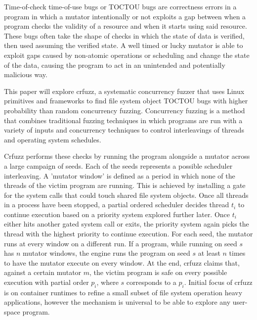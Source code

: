 

    Time-of-check time-of-use bugs or TOCTOU bugs are correctness errors in a program 
in which a mutator intentionally or not exploits a gap between when a program checks the validity of a resource and when it starts using 
said resource. These bugs often take the shape of checks in which the state of data is verified, then used assuming 
the verified state. A well timed or lucky mutator is able to exploit gaps caused by non-atomic operations or scheduling and change the state of the data,
causing the program to act in an unintended and potentially malicious way. 

This paper will explore crfuzz, a systematic concurrency fuzzer that uses Linux primitives and frameworks to find file system object TOCTOU bugs with higher probability than random concurrency fuzzing. Concurrency fuzzing is a method that combines traditional fuzzing techniques in which programs are 
run with a variety of inputs and concurrency techniques to control interleavings of threads and operating system schedules.

Crfuzz performs these checks by running the program alongside a mutator across a large campaign of seeds. Each of the seeds represents a possible scheduler interleaving.
A 'mutator window' is defined as a period in which none of the threads of the victim program are running. This is achieved by installing a gate for the system calls that could touch 
shared file system objects. Once all threads in a process have been stopped, a partial ordered scheduler decides thread  $t_i$ to continue execution based on a priority system 
explored further later. Once $t_i$ either hits another gated system call or exits, the priority system again picks the thread with the highest priority to continue execution.
For each seed, the mutator runs at every window on a different run. If a program, while running on seed $s$ has $n$ mutator windows, the engine runs the program on seed $s$ at least $n$ times to have the mutator execute on every window. At the end, crfuzz claims that, against a certain mutator $m$, the victim program is safe on every possible execution with partial order $p_i$, where $s$ corresponds to a $p_i$. Initial focus of crfuzz is on container runtimes to refine a small subset of file system operation heavy applications, however 
the mechanism is universal to be able to explore any user-space program.

